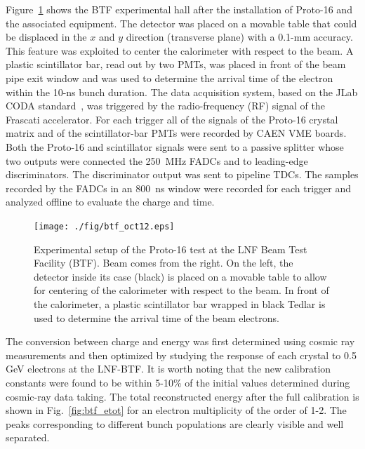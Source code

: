 Figure~\ref{fig:btf} shows the BTF experimental hall after the installation of Proto-16 and the associated equipment.
The detector was placed on a movable table that could be displaced in the $x$ and $y$ direction (transverse
plane) with a 0.1-mm accuracy. This feature was exploited to center the calorimeter with respect to the beam. A
plastic scintillator bar, read out by two PMTs, was placed in front of the beam pipe exit window and was used to
determine the arrival time of the electron within the 10-ns bunch duration. The data acquisition system, based on the
JLab CODA standard~\cite{daq}, was triggered by the radio-frequency (RF) signal of the Frascati accelerator. For
each trigger all of the signals of the Proto-16 crystal matrix and of the scintillator-bar PMTs were recorded by
CAEN VME boards. Both the Proto-16 and scintillator signals were sent to a passive splitter whose two outputs were
connected the 250~MHz FADCs and to leading-edge discriminators. The discriminator output was sent to pipeline
TDCs. The samples recorded by the FADCs in an 800~ns window were recorded for each trigger and analyzed offline
to evaluate the charge and time.

\begin{figure}
\texttt{[image: ./fig/btf\_oct12.eps]}
\caption{Experimental setup of the Proto-16 test at the LNF Beam Test Facility (BTF). Beam comes from the right.
  On the left, the detector inside its case (black) is placed on a movable table to allow for centering of the calorimeter
  with respect to the beam. In front of the calorimeter, a plastic scintillator bar wrapped in black Tedlar is used to
  determine the arrival time of the beam electrons.}
\label{fig:btf}
\end{figure}

The conversion between charge and energy was first determined using cosmic ray measurements and then optimized
by studying the response of each crystal to 0.5 GeV electrons at the LNF-BTF. It is worth noting that the new
calibration constants were found to be within 5-10\% of the initial values determined during cosmic-ray data
taking. The total reconstructed energy  after the full calibration is shown in Fig.~\ref{fig:btf_etot} for an electron
multiplicity of the order of 1-2. The peaks corresponding to different bunch populations are clearly visible and well
separated. 


